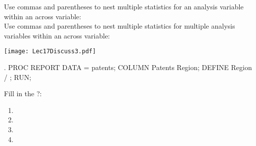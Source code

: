 
\begin{frame}[fragile]
\hspace*{-0.3in}
Use commas and parentheses to nest multiple statistics for an analysis variable within an across variable:\\
\vskip5pt
\vskip30pt
Use commas and parentheses to nest multiple statistics for multiple analysis variables within an across variable:\\
\vskip5pt
\emp
\end{frame}

\begin{frame}[fragile]
\begin{center}
\texttt{[image: Lec17Discuss3.pdf]}
\end{center}
\begin{code}{.}
PROC REPORT DATA = patents;
   COLUMN Patents \textcolor{OrangeRed}{} Region;
   DEFINE Region / \textcolor{OrangeRed}{};
RUN;
\end{code}
\emp
{} \hspace{0.05in} \emp
{}
\begin{clicker}{Fill in the ?:}
\begin{enumerate}
\item \ttt{* } 
\item \ttt{, }  %
\item \ttt{* } 
\item \ttt{, } 
\end{enumerate}
\end{clicker}
\emp
\end{frame}



